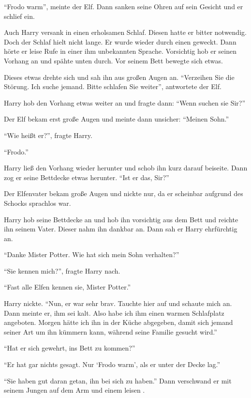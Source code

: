 \enquote{Frodo warm}, meinte der Elf. Dann sanken seine Ohren auf sein Gesicht und er schlief ein.

Auch Harry versank in einen erholsamen Schlaf. Diesen hatte er bitter notwendig. Doch der Schlaf hielt nicht lange. Er wurde wieder durch einen  geweckt. Dann hörte er leise Rufe in einer ihm unbekannten Sprache. Vorsichtig hob er seinen Vorhang an und spähte unten durch. Vor seinem Bett bewegte sich etwas.

Dieses etwas drehte sich und sah ihn aus großen Augen an. \enquote{Verzeihen Sie die Störung. Ich suche jemand. Bitte schlafen Sie weiter}, antwortete der Elf.

Harry hob den Vorhang etwas weiter an und fragte dann: \enquote{Wenn suchen sie Sir?}

Der Elf bekam erst große Augen und meinte dann unsicher: \enquote{Meinen Sohn.}

\enquote{Wie heißt er?}, fragte Harry.

\enquote{Frodo.}

Harry ließ den Vorhang wieder herunter und schob ihn kurz darauf beiseite. Dann zog er seine Bettdecke etwas herunter. \enquote{Ist er das, Sir?}

Der Elfenvater bekam große Augen und nickte nur, da er scheinbar aufgrund des Schocks sprachlos war.

Harry hob seine Bettdecke an und hob ihn vorsichtig aus dem Bett und reichte ihn seinem Vater. Dieser nahm ihn dankbar an. Dann sah er Harry ehrfürchtig an.

\enquote{Danke Mister Potter. Wie hat sich mein Sohn verhalten?}

\enquote{Sie kennen mich?}, fragte Harry nach.

\enquote{Fast alle Elfen kennen sie, Mister Potter.}

Harry nickte. \enquote{Nun, er war sehr brav. Tauchte hier auf und schaute mich an. Dann meinte er, ihm sei kalt. Also habe ich ihm einen warmen Schlafplatz angeboten. Morgen hätte ich ihn in der Küche abgegeben, damit sich jemand seiner Art um ihn kümmern kann, während seine Familie gesucht wird.}

\enquote{Hat er sich gewehrt, ins Bett zu kommen?}

\enquote{Er hat gar nichts gesagt. Nur \enquote{Frodo warm}, als er unter der Decke lag.}

\enquote{Sie haben gut daran getan, ihn bei sich zu haben.} Dann verschwand er mit seinem Jungen auf dem Arm und einem leisen .

